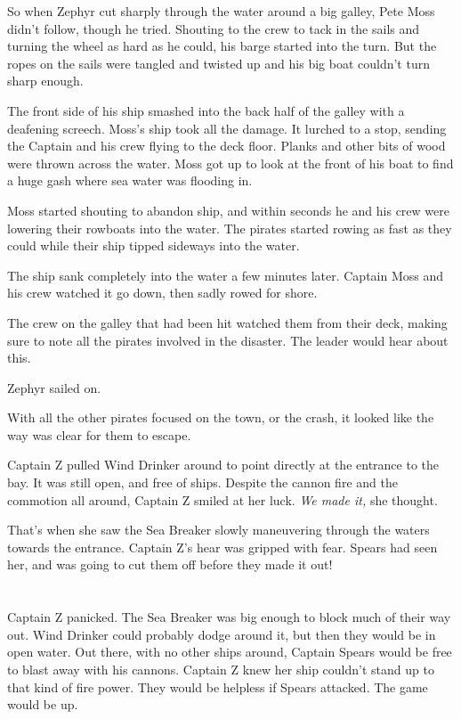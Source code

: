 \documentclass[12pt]{extbook}
\begin{document}
  So when Zephyr cut sharply through the water around a big galley, Pete
  Moss didn't follow, though he tried. Shouting to the crew to tack in the
  sails and turning the wheel as hard as he could, his barge started into
  the turn. But the ropes on the sails were tangled and twisted up and his
  big boat couldn't turn sharp enough.
  
  The front side of his ship smashed into the back half of the galley with
  a deafening screech. Moss's ship took all the damage. It lurched to a
  stop, sending the Captain and his crew flying to the deck floor. Planks
  and other bits of wood were thrown across the water. Moss got up to look
  at the front of his boat to find a huge gash where sea water was
  flooding in.
  
  Moss started shouting to abandon ship, and within seconds he and his
  crew were lowering their rowboats into the water. The pirates started
  rowing as fast as they could while their ship tipped sideways into the
  water.
  
  The ship sank completely into the water a few minutes later. Captain
  Moss and his crew watched it go down, then sadly rowed for shore.
  
  The crew on the galley that had been hit watched them from their deck,
  making sure to note all the pirates involved in the disaster. The leader
  would hear about this.
  
  Zephyr sailed on.
  
  With all the other pirates focused on the town, or the crash, it looked
  like the way was clear for them to escape.
  
  Captain Z pulled Wind Drinker around to point directly at the entrance
  to the bay. It was still open, and free of ships. Despite the cannon
  fire and the commotion all around, Captain Z smiled at her luck.
  \emph{We made it,} she thought.
  
  That's when she saw the Sea Breaker slowly maneuvering through the
  waters towards the entrance. Captain Z's hear was gripped with fear.
  Spears had seen her, and was going to cut them off before they made it
  out!
  
  \section{}\label{section-42}
  
  Captain Z panicked. The Sea Breaker was big enough to block much of
  their way out. Wind Drinker could probably dodge around it, but then
  they would be in open water. Out there, with no other ships around,
  Captain Spears would be free to blast away with his cannons. Captain Z
  knew her ship couldn't stand up to that kind of fire power. They would
  be helpless if Spears attacked. The game would be up.
  
\end{document}

